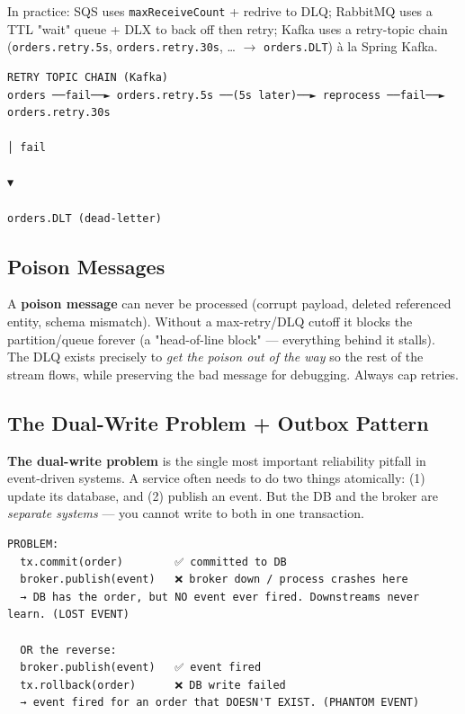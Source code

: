 \documentclass[11pt]{article}
\begin{document}
In practice: SQS uses \texttt{maxReceiveCount} + redrive to DLQ; RabbitMQ uses a TTL "wait" queue + DLX to back off then retry; Kafka uses a retry-topic chain (\texttt{orders.retry.5s}, \texttt{orders.retry.30s}, \ldots{} \(\rightarrow\) \texttt{orders.DLT}) à la Spring Kafka.

\setcodelang{}

\begin{verbatim}
RETRY TOPIC CHAIN (Kafka)
orders ──fail──► orders.retry.5s ──(5s later)──► reprocess ──fail──► orders.retry.30s
                                                                          │ fail
                                                                          ▼
                                                                   orders.DLT (dead-letter)
\end{verbatim}

\subsection{Poison Messages}\label{poison-messages}

A \textbf{poison message} can never be processed (corrupt payload, deleted referenced entity, schema mismatch). Without a max-retry/DLQ cutoff it blocks the partition/queue forever (a "head-of-line block" --- everything behind it stalls). The DLQ exists precisely to \emph{get the poison out of the way} so the rest of the stream flows, while preserving the bad message for debugging. Always cap retries.

\subsection{The Dual-Write Problem + Outbox Pattern}\label{the-dual-write-problem--outbox-pattern}

\textbf{The dual-write problem} is the single most important reliability pitfall in event-driven systems. A service often needs to do two things atomically: (1) update its database, and (2) publish an event. But the DB and the broker are \emph{separate systems} --- you cannot write to both in one transaction.

\setcodelang{}

\begin{verbatim}
PROBLEM:
  tx.commit(order)        ✅ committed to DB
  broker.publish(event)   ❌ broker down / process crashes here
  → DB has the order, but NO event ever fired. Downstreams never learn. (LOST EVENT)

  OR the reverse:
  broker.publish(event)   ✅ event fired
  tx.rollback(order)      ❌ DB write failed
  → event fired for an order that DOESN'T EXIST. (PHANTOM EVENT)
\end{verbatim}
\end{document}
